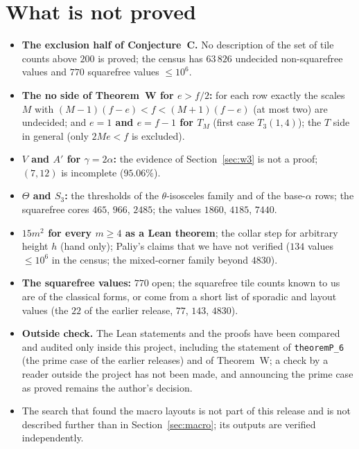 \documentclass[11pt,reqno]{amsart}
\theoremstyle{plain}
\theoremstyle{definition}
\begin{document}
\section{What is not proved}\label{sec:notproved}
\begin{itemize}
\item \textbf{The exclusion half of Conjecture~C.} No description of the set of tile counts above $200$ is proved; the census has $63\,826$ undecided non-squarefree values and $770$ squarefree values $\le10^6$.
\item \textbf{The no side of Theorem~W for $e>f/2$:} for each row exactly the scales $M$ with $(M-1)(f-e)<f<(M+1)(f-e)$ (at most two) are undecided; and \textbf{$e=1$ and $e=f-1$ for $T_M$} (first case $T_3(1,4)$); the $T$ side in general (only $2Me<f$ is excluded).
\item \textbf{$V$ and $A'$ for $\gamma=2\alpha$:} the evidence of Section~\ref{sec:w3} is not a proof; $(7,12)$ is incomplete ($95.06\%$).
\item \textbf{$\Theta$ and $S_3$:} the thresholds of the $\theta$-isosceles family and of the base-$\alpha$ rows; the squarefree cores $465$, $966$, $2485$; the values $1860$, $4185$, $7440$.
\item \textbf{$15m^2$ for every $m\ge4$ as a Lean theorem}; the collar step for arbitrary height $h$ (hand only); Paliy's claims that we have not verified ($134$ values $\le10^6$ in the census; the mixed-corner family beyond $4830$).
\item \textbf{The squarefree values:} $770$ open; the squarefree tile counts known to us are of the classical forms, or come from a short list of sporadic and layout values (the $22$ of the earlier release, $77$, $143$, $4830$).
\item \textbf{Outside check.} The Lean statements and the proofs have been compared and audited only inside this project, including the statement of \texttt{theoremP\_6} (the prime case of the earlier releases) and of Theorem~W; a check by a reader outside the project has not been made, and announcing the prime case as proved remains the author's decision.
\item The search that found the macro layouts is not part of this release and is not described further than in Section~\ref{sec:macro}; its outputs are verified independently.
\end{itemize}

\end{document}

